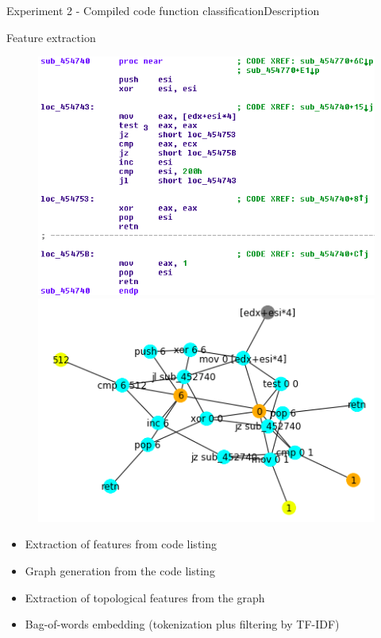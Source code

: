 \documentclass[xcolor=table]{beamer}
\begin{document}
\begin{frame}{Experiment 2 - Compiled code function classification}{Description}


Feature extraction


\begin{figure}[H]
%
  \centering
    \includegraphics[width=0.9\linewidth]{img/code_graph02.png}
\endminipage
{}%
  \centering
    \includegraphics[width=0.9\linewidth]{img/code_graph01.png}
\endminipage
\end{figure}

\begin{itemize}
\item Extraction of features from code listing\\
\item Graph generation from the code listing\\
\item Extraction of topological features from the graph
\item Bag-of-words embedding (tokenization plus filtering by TF-IDF)
\end{itemize}


\end{frame}
\end{document}
